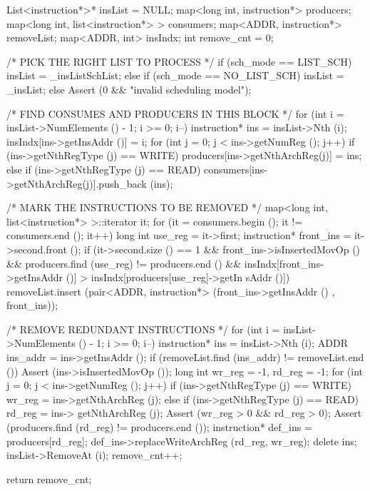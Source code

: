 \begin{DoxyCode}
                                                {
    List<instruction*>* insList = NULL;
    map<long int, instruction*> producers;
    map<long int, list<instruction*> > consumers;
    map<ADDR, instruction*> removeList;
    map<ADDR, int> insIndx;
    int remove_cnt = 0;

    /* PICK THE RIGHT LIST TO PROCESS */
    if (sch_mode == LIST_SCH) {
        insList = _insListSchList;
    } else if (sch_mode == NO_LIST_SCH) {
        insList = _insList;
    } else {
        Assert (0 && "invalid scheduling model");
    }

    /* FIND CONSUMES AND PRODUCERS IN THIS BLOCK */
    for (int i = insList->NumElements () - 1; i >= 0; i--) {
        instruction* ins = insList->Nth (i);
        insIndx[ins->getInsAddr ()] = i;
        for (int j = 0; j < ins->getNumReg (); j++) {
            if (ins->getNthRegType (j) == WRITE) {
                producers[ins->getNthArchReg(j)] = ins;
            } else if (ins->getNthRegType (j) == READ) {
                consumers[ins->getNthArchReg(j)].push_back (ins);
            }
        }
    }

    /* MARK THE INSTRUCTIONS TO BE REMOVED */
    map<long int, list<instruction*> >::iterator it;
    for (it = consumers.begin (); it != consumers.end (); it++) {
        long int use_reg = it->first;
        instruction* front_ins = it->second.front ();
        if (it->second.size () == 1 &&
            front_ins->isInsertedMovOp () &&
            producers.find (use_reg) != producers.end () &&
            insIndx[front_ins->getInsAddr ()] > insIndx[producers[use_reg]->getIn
      sAddr ()])
        {
            removeList.insert (pair<ADDR, instruction*> (front_ins->getInsAddr ()
      , front_ins));
        }
    }

    /* REMOVE REDUNDANT INSTRUCTIONS */
    for (int i = insList->NumElements () - 1; i >= 0; i--) {
        instruction* ins = insList->Nth (i);
        ADDR ins_addr = ins->getInsAddr ();
        if (removeList.find (ins_addr) != removeList.end ()) {
            Assert (ins->isInsertedMovOp ());
            long int wr_reg = -1, rd_reg = -1;
            for (int j = 0; j < ins->getNumReg (); j++) {
                if (ins->getNthRegType (j) == WRITE) wr_reg = ins->getNthArchReg 
      (j);
                else if (ins->getNthRegType (j) == READ) rd_reg = ins->
      getNthArchReg (j);
            }
            Assert (wr_reg > 0 && rd_reg > 0);
            Assert (producers.find (rd_reg) != producers.end ());
            instruction* def_ins = producers[rd_reg];
            def_ins->replaceWriteArchReg (rd_reg, wr_reg);
            delete ins;
            insList->RemoveAt (i);
            remove_cnt++;
        }
    }

    return remove_cnt;
}
\end{DoxyCode}


